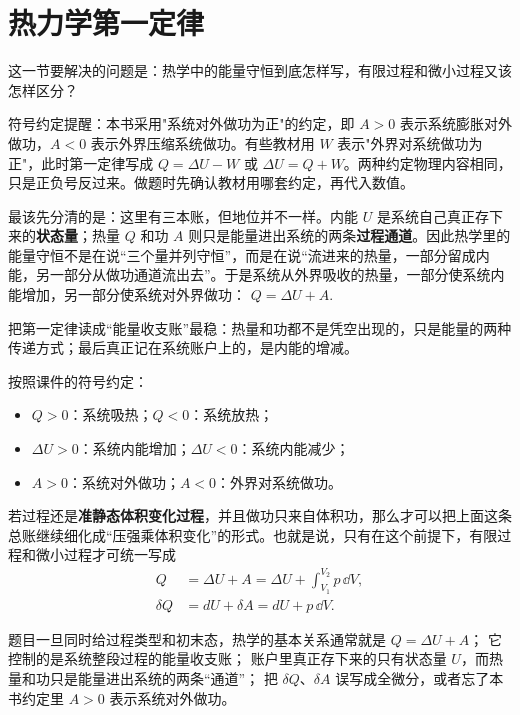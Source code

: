 \documentclass[lang=cn,11pt]{elegantbook}
\newcommand{\bridge}[1]{\begin{note}#1\end{note}}
\begin{document}
\section{热力学第一定律}

这一节要解决的问题是：热学中的能量守恒到底怎样写，有限过程和微小过程又该怎样区分？

\bridge{符号约定提醒：本书采用"系统对外做功为正"的约定，即 \(A>0\) 表示系统膨胀对外做功，\(A<0\) 表示外界压缩系统做功。有些教材用 \(W\) 表示"外界对系统做功为正"，此时第一定律写成 \(Q=\Delta U-W\) 或 \(\Delta U=Q+W\)。两种约定物理内容相同，只是正负号反过来。做题时先确认教材用哪套约定，再代入数值。}

\begin{theorem}[热力学第一定律]\label{thm:first-law}
最该先分清的是：这里有三本账，但地位并不一样。内能 \(U\) 是系统自己真正存下来的\textbf{状态量}；热量 \(Q\) 和功 \(A\) 则只是能量进出系统的两条\textbf{过程通道}。因此热学里的能量守恒不是在说“三个量并列守恒”，而是在说“流进来的热量，一部分留成内能，另一部分从做功通道流出去”。于是系统从外界吸收的热量，一部分使系统内能增加，另一部分使系统对外界做功：
 \(Q=\Delta U+A.\) 
\end{theorem}

\bridge{把第一定律读成“能量收支账”最稳：热量和功都不是凭空出现的，只是能量的两种传递方式；最后真正记在系统账户上的，是内能的增减。}

按照课件的符号约定：
\begin{itemize}
 \item \(Q>0\)：系统吸热；\(Q<0\)：系统放热；
 \item \(\Delta U>0\)：系统内能增加；\(\Delta U<0\)：系统内能减少；
 \item \(A>0\)：系统对外做功；\(A<0\)：外界对系统做功。
\end{itemize}

若过程还是\textbf{准静态体积变化过程}，并且做功只来自体积功，那么才可以把上面这条总账继续细化成“压强乘体积变化”的形式。也就是说，只有在这个前提下，有限过程和微小过程才可统一写成
\begin{align*}
Q&=\Delta U+A=\Delta U+\int_{V_1}^{V_2}p\,\dd V,\\
\delta Q&=dU+\delta A=dU+p\,\dd V.
\end{align*}

\begin{note}
 题目一旦同时给过程类型和初末态，热学的基本关系通常就是 \(Q=\Delta U+A\)； 它控制的是系统整段过程的能量收支账； 账户里真正存下来的只有状态量 \(U\)，而热量和功只是能量进出系统的两条“通道”； 把 \(\delta Q\)、\(\delta A\) 误写成全微分，或者忘了本书约定里 \(A>0\) 表示系统对外做功。
\end{note}
\end{document}
